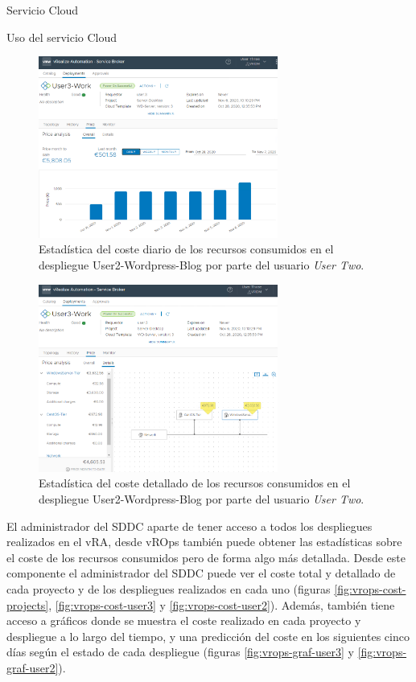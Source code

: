 \begin{subsection}{Servicio Cloud}
\begin{subsubsection}{Uso del servicio Cloud}
        \begin{figure}[h]
            \centering
            \includegraphics[width=0.7\textwidth]{imaxes/pruebaconcepto/vrealize/price-user3-work.png}
            \caption{Estadística del coste diario de los recursos consumidos en el despliegue User2-Wordpress-Blog por parte del usuario \textit{User Two}.}
            \label{fig:user2-daily-price}
        \end{figure}
        \FloatBarrier
        \begin{figure}[h]
            \centering
            \includegraphics[width=0.7\textwidth]{imaxes/pruebaconcepto/vrealize/user3-price-details.png}
            \caption{Estadística del coste detallado de los recursos consumidos en el despliegue User2-Wordpress-Blog por parte del usuario \textit{User Two}.}
            \label{fig:user2-detail-price}
        \end{figure}
        \FloatBarrier
        El administrador del SDDC aparte de tener acceso a todos los despliegues realizados en el vRA, desde vROps también puede obtener las estadísticas sobre el coste de los recursos consumidos pero de forma algo más detallada. Desde este componente el administrador del SDDC puede ver el coste total y detallado de cada proyecto y de los despliegues realizados en cada uno (figuras \ref{fig:vrops-cost-projects}, \ref{fig:vrops-cost-user3} y \ref{fig:vrops-cost-user2}). Además, también tiene acceso a gráficos donde se muestra el coste realizado en cada proyecto y despliegue a lo largo del tiempo, y una predicción del coste en los siguientes cinco días según el estado de cada despliegue (figuras \ref{fig:vrops-graf-user3} y \ref{fig:vrops-graf-user2}).

\end{subsubsection}
\end{subsection}
